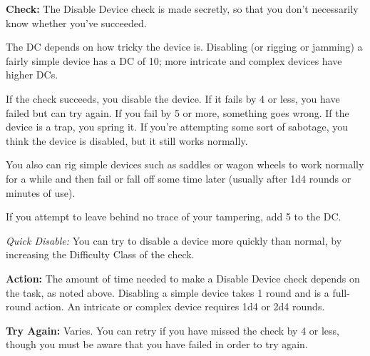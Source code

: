 \textbf{Check:} The Disable Device check is made secretly, so that you don't necessarily know whether you've succeeded.

The DC depends on how tricky the device is. Disabling (or rigging or jamming) a fairly simple device has a DC of 10; more intricate and complex devices have higher DCs.

If the check succeeds, you disable the device. If it fails by 4 or less, you have failed but can try again. If you fail by 5 or more, something goes wrong. If the device is a trap, you spring it. If you're attempting some sort of sabotage, you think the device is disabled, but it still works normally.

You also can rig simple devices such as saddles or wagon wheels to work normally for a while and then fail or fall off some time later (usually after 1d4 rounds or minutes of use).


If you attempt to leave behind no trace of your tampering, add 5 to the DC.

\textit{Quick Disable:} You can try to disable a device more quickly than normal, by increasing the Difficulty Class of the check.


\textbf{Action:} The amount of time needed to make a Disable Device check depends on the task, as noted above. Disabling a simple device takes 1 round and is a full-round action. An intricate or complex device requires 1d4 or 2d4 rounds.

\textbf{Try Again:} Varies. You can retry if you have missed the check by 4 or less, though you must be aware that you have failed in order to try again.

